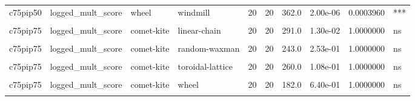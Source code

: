 \documentclass[
]{book}
\begin{document}
\begin{table}
\begin{tabular}{l|l|l|l|r|r|r|r|r|l}
\hline
\cellcolor{gray!6}{c75pip50} & \cellcolor{gray!6}{logged\_mult\_score} & \cellcolor{gray!6}{well-mixed} & \cellcolor{gray!6}{windmill} & \cellcolor{gray!6}{20} & \cellcolor{gray!6}{20} & \cellcolor{gray!6}{0.0} & \cellcolor{gray!6}{0.00e+00} & \cellcolor{gray!6}{0.0000000} & \cellcolor{gray!6}{****}\\
\hline
c75pip50 & logged\_mult\_score & wheel & windmill & 20 & 20 & 362.0 & 2.00e-06 & 0.0003960 & ***\\
\hline
\cellcolor{gray!6}{c75pip75} & \cellcolor{gray!6}{logged\_mult\_score} & \cellcolor{gray!6}{comet-kite} & \cellcolor{gray!6}{cycle} & \cellcolor{gray!6}{20} & \cellcolor{gray!6}{20} & \cellcolor{gray!6}{240.0} & \cellcolor{gray!6}{2.89e-01} & \cellcolor{gray!6}{1.0000000} & \cellcolor{gray!6}{ns}\\
\hline
c75pip75 & logged\_mult\_score & comet-kite & linear-chain & 20 & 20 & 291.0 & 1.30e-02 & 1.0000000 & ns\\
\hline
\cellcolor{gray!6}{c75pip75} & \cellcolor{gray!6}{logged\_mult\_score} & \cellcolor{gray!6}{comet-kite} & \cellcolor{gray!6}{random-barabasi-albert} & \cellcolor{gray!6}{20} & \cellcolor{gray!6}{20} & \cellcolor{gray!6}{251.0} & \cellcolor{gray!6}{1.74e-01} & \cellcolor{gray!6}{1.0000000} & \cellcolor{gray!6}{ns}\\
\hline
c75pip75 & logged\_mult\_score & comet-kite & random-waxman & 20 & 20 & 243.0 & 2.53e-01 & 1.0000000 & ns\\
\hline
\cellcolor{gray!6}{c75pip75} & \cellcolor{gray!6}{logged\_mult\_score} & \cellcolor{gray!6}{comet-kite} & \cellcolor{gray!6}{star} & \cellcolor{gray!6}{20} & \cellcolor{gray!6}{20} & \cellcolor{gray!6}{70.0} & \cellcolor{gray!6}{2.58e-04} & \cellcolor{gray!6}{0.0387000} & \cellcolor{gray!6}{*}\\
\hline
c75pip75 & logged\_mult\_score & comet-kite & toroidal-lattice & 20 & 20 & 260.0 & 1.08e-01 & 1.0000000 & ns\\
\hline
\cellcolor{gray!6}{c75pip75} & \cellcolor{gray!6}{logged\_mult\_score} & \cellcolor{gray!6}{comet-kite} & \cellcolor{gray!6}{well-mixed} & \cellcolor{gray!6}{20} & \cellcolor{gray!6}{20} & \cellcolor{gray!6}{175.0} & \cellcolor{gray!6}{5.12e-01} & \cellcolor{gray!6}{1.0000000} & \cellcolor{gray!6}{ns}\\
\hline
c75pip75 & logged\_mult\_score & comet-kite & wheel & 20 & 20 & 182.0 & 6.40e-01 & 1.0000000 & ns\\
\hline
\cellcolor{gray!6}{c75pip75} & \cellcolor{gray!6}{logged\_mult\_score} & \cellcolor{gray!6}{comet-kite} & \cellcolor{gray!6}{windmill} & \cellcolor{gray!6}{20} & \cellcolor{gray!6}{20} & \cellcolor{gray!6}{223.0} & \cellcolor{gray!6}{5.47e-01} & \cellcolor{gray!6}{1.0000000} & \cellcolor{gray!6}{ns}\\

\end{tabular}
\end{table}
\end{document}
